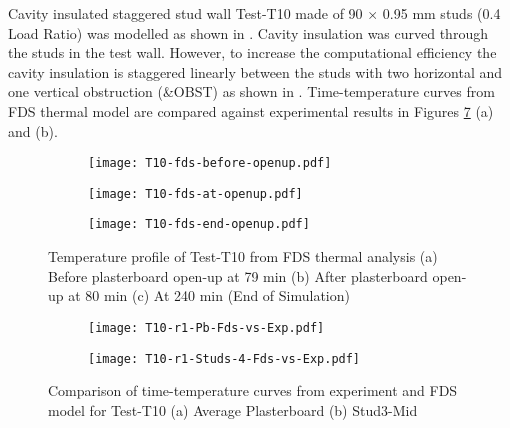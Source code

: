 Cavity insulated staggered stud wall Test-T10 made of 90 $\times$ 0.95 mm studs (0.4 Load Ratio) was modelled as shown in . Cavity insulation was curved through the studs in the test wall. However, to increase the computational efficiency the cavity insulation is staggered linearly between the studs with two horizontal and one vertical obstruction (\&OBST) as shown in . Time-temperature curves from FDS thermal model are compared against experimental results in Figures \ref{fig:fds-output-pb-studs-t10} (a) and (b).
\begin{figure}[!htbp]
	\centering
	\begin{subfigure}[b]{0.45\textwidth}
		\centering
		\texttt{[image: T10-fds-before-openup.pdf]}
		\caption{}
		\label{subfig:T10-fds-before-openup}
	\end{subfigure}
	\begin{subfigure}[b]{0.45\textwidth}
		\centering
		\texttt{[image: T10-fds-at-openup.pdf]}
		\caption{}
		\label{subfig:T10-fds-at-openup}
	\end{subfigure}
	\begin{subfigure}[b]{0.45\textwidth}
		\centering
		\texttt{[image: T10-fds-end-openup.pdf]}
		\caption{}
		\label{subfig:T10-fds-end-openup}
	\end{subfigure}
	   \caption{Temperature profile of Test-T10 from FDS thermal analysis (a) Before plasterboard open-up at 79 min (b) After plasterboard open-up at 80 min (c) At 240 min (End of Simulation)}
	   \label{fig:T10-fds-output}
\end{figure}
\begin{figure}[!htbp]
	\centering
	\begin{subfigure}[b]{0.7\textwidth}
		\centering
		\texttt{[image: T10-r1-Pb-Fds-vs-Exp.pdf]}
		\caption{}
		\label{subfig:T10-r1-Pb-Fds-vs-Exp}
	\end{subfigure}
	\begin{subfigure}[b]{0.6\textwidth}
		\centering
		\texttt{[image: T10-r1-Studs-4-Fds-vs-Exp.pdf]}
		\caption{}
		\label{subfig:T10-r1-Studs-4-Fds-vs-Exp}
	\end{subfigure}
	   \caption{Comparison of time-temperature curves from experiment and FDS model for Test-T10 (a) Average Plasterboard (b) Stud3-Mid}
	   \label{fig:fds-output-pb-studs-t10}
\end{figure}


